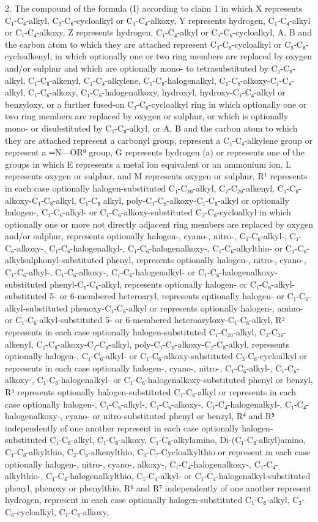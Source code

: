 \documentclass[11pt,a4paper]{article}
\begin{document}
2. The compound of the formula (I) according to claim 1 in which X represents C₁-C₄-alkyl, C₃-C₆-cycloalkyl or C₁-C₄-alkoxy, Y represents hydrogen, C₁-C₄-alkyl or C₁-C₄-alkoxy, Z represents hydrogen, C₁-C₄-alkyl or C₃-C₆-cycloalkyl, A, B and the carbon atom to which they are attached represent C₃-C₈-cycloalkyl or C₅-C₈-cycloalkenyl, in which optionally one or two ring members are replaced by oxygen and/or sulphur and which are optionally mono- to tetrasubstituted by C₁-C₈-alkyl, C₁-C₈-alkenyl, C₁-C₄-alkylene, C₁-C₈-halogenalkyl, C₁-C₆-alkoxy-C₁-C₄-alkyl, C₁-C₆-alkoxy, C₁-C₆-halogenalkoxy, hydroxyl, hydroxy-C₁-C₄-alkyl or benzyloxy, or a further fused-on C₃-C₈-cycloalkyl ring in which optionally one or two ring members are replaced by oxygen or sulphur, or which is optionally mono- or disubstituted by C₁-C₈-alkyl, or A, B and the carbon atom to which they are attached represent a carbonyl group, represent a C₁-C₄-alkylene group or represent a ═N—OR⁹ group, G represents hydrogen (a) or represents one of the groups in which E represents a metal ion equivalent or an ammonium ion, L represents oxygen or sulphur, and M represents oxygen or sulphur, R¹ represents in each case optionally halogen-substituted C₁-C₂₀-alkyl, C₂-C₂₀-alkenyl, C₁-C₈-alkoxy-C₁-C₈-alkyl, C₁-C₈ alkyl, poly-C₁-C₈-alkoxy-C₁-C₈-alkyl or optionally halogen-, C₁-C₆-alkyl- or C₁-C₆-alkoxy-substituted C₃-C₈-cycloalkyl in which optionally one or more not directly adjacent ring members are replaced by oxygen and/or sulphur, represents optionally halogen-, cyano-, nitro-, C₁-C₆-alkyl-, C₁-C₆-alkoxy-, C₁-C₆-halogenalkyl-, C₁-C₆-halogenalkoxy-, C₁-C₆-alkylthio- or C₁-C₆-alkylsulphonyl-substituted phenyl, represents optionally halogen-, nitro-, cyano-, C₁-C₆-alkyl-, C₁-C₆-alkoxy-, C₁-C₆-halogenalkyl- or C₁-C₆-halogenalkoxy-substituted phenyl-C₁-C₆-alkyl, represents optionally halogen- or C₁-C₆-alkyl-substituted 5- or 6-membered heteroaryl, represents optionally halogen- or C₁-C₆-alkyl-substituted phenoxy-C₁-C₆-alkyl or represents optionally halogen-, amino- or C₁-C₆-alkyl-substituted 5- or 6-membered heteroaryloxy-C₁-C₆-alkyl, R² represents in each case optionally halogen-substituted C₁-C₂₀-alkyl, C₂-C₂₀-alkenyl, C₁-C₈-alkoxy-C₂-C₈-alkyl, poly-C₁-C₈-alkoxy-C₂-C₈-alkyl, represents optionally halogen-, C₁-C₆-alkyl- or C₁-C₆-alkoxy-substituted C₃-C₈-cycloalkyl or represents in each case optionally halogen-, cyano-, nitro-, C₁-C₆-alkyl-, C₁-C₆-alkoxy-, C₁-C₆-halogenalkyl- or C₁-C₆-halogenalkoxy-substituted phenyl or benzyl, R³ represents optionally halogen-substituted C₁-C₈-alkyl or represents in each case optionally halogen-, C₁-C₆-alkyl-, C₁-C₆-alkoxy-, C₁-C₄-halogenalkyl-, C₁-C₄-halogenalkoxy-, cyano- or nitro-substituted phenyl or benzyl, R⁴ and R⁵ independently of one another represent in each case optionally halogen-substituted C₁-C₈-alkyl, C₁-C₈-alkoxy, C₁-C₈-alkylamino, Di-(C₁-C₈-alkyl)amino, C₁-C₈-alkylthio, C₂-C₈-alkenylthio, C₃-C₇-Cycloalkylthio or represent in each case optionally halogen-, nitro-, cyano-, alkoxy-, C₁-C₄-halogenalkoxy-, C₁-C₄-alkylthio-, C₁-C₄-halogenalkylthio, C₁-C₄-alkyl- or C₁-C₄-halogenalkyl-substituted phenyl, phenoxy or phenylthio, R⁶ and R⁷ independently of one another represent hydrogen, represent in each case optionally halogen-substituted C₁-C₈-alkyl, C₃-C₈-cycloalkyl, C₁-C₈-alkoxy, 
\end{document}

